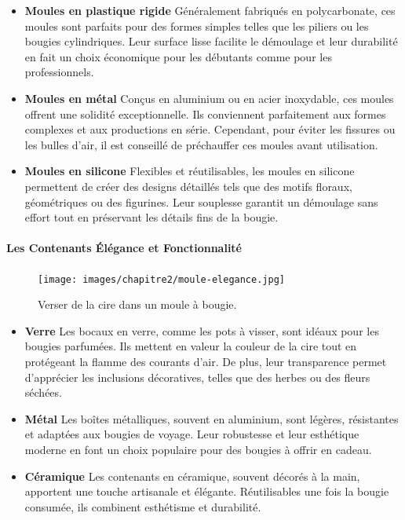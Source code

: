 \documentclass[11pt,fleqn,onecolumn,oneside]{book}
\begin{document}
\begin{itemize}
    \item \textbf{Moules en plastique rigide} Généralement fabriqués en polycarbonate, ces moules sont parfaits pour des formes simples telles que les piliers ou les bougies cylindriques. Leur surface lisse facilite le démoulage et leur durabilité en fait un choix économique pour les débutants comme pour les professionnels.
    \item \textbf{Moules en métal} Conçus en aluminium ou en acier inoxydable, ces moules offrent une solidité exceptionnelle. Ils conviennent parfaitement aux formes complexes et aux productions en série. Cependant, pour éviter les fissures ou les bulles d’air, il est conseillé de préchauffer ces moules avant utilisation.
    \item \textbf{Moules en silicone} Flexibles et réutilisables, les moules en silicone permettent de créer des designs détaillés tels que des motifs floraux, géométriques ou des figurines. Leur souplesse garantit un démoulage sans effort tout en préservant les détails fins de la bougie.
\end{itemize}

\paragraph{Les Contenants Élégance et Fonctionnalité}


\begin{figure}[htbp]
    \centering
    \texttt{[image: images/chapitre2/moule-elegance.jpg]}
    \caption{Verser de la cire dans un moule à bougie.}
    \label{fig:process_coloration}
\end{figure}

\begin{itemize}
    \item \textbf{Verre} Les bocaux en verre, comme les pots à visser, sont idéaux pour les bougies parfumées. Ils mettent en valeur la couleur de la cire tout en protégeant la flamme des courants d’air. De plus, leur transparence permet d’apprécier les inclusions décoratives, telles que des herbes ou des fleurs séchées.
    \item \textbf{Métal} Les boîtes métalliques, souvent en aluminium, sont légères, résistantes et adaptées aux bougies de voyage. Leur robustesse et leur esthétique moderne en font un choix populaire pour des bougies à offrir en cadeau.
    \item \textbf{Céramique} Les contenants en céramique, souvent décorés à la main, apportent une touche artisanale et élégante. Réutilisables une fois la bougie consumée, ils combinent esthétisme et durabilité.
\end{itemize}
\end{document}
